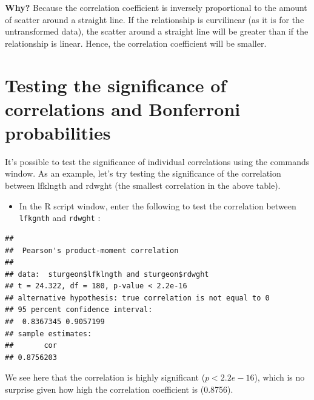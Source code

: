 \documentclass[
  12pt,
]{book}
\newenvironment{Shaded}{\begin{snugshade}}{\end{snugshade}}
\newcommand{\DataTypeTok}[1]{\textcolor[rgb]{0.13,0.29,0.53}{#1}}
\newcommand{\KeywordTok}[1]{\textcolor[rgb]{0.13,0.29,0.53}{\textbf{#1}}}
\newcommand{\NormalTok}[1]{#1}
\newcommand{\OperatorTok}[1]{\textcolor[rgb]{0.81,0.36,0.00}{\textbf{#1}}}
\newcommand{\StringTok}[1]{\textcolor[rgb]{0.31,0.60,0.02}{#1}}
\providecommand{\tightlist}{%
  \setlength{\itemsep}{0pt}\setlength{\parskip}{0pt}}
\begin{document}
\textbf{Why?} Because the correlation coefficient is inversely proportional to the amount of scatter around a straight line. If the relationship is curvilinear (as it is for the untransformed data), the scatter around a straight line will be greater than if the relationship is linear.
Hence, the correlation coefficient will be smaller.

\hypertarget{testing-the-significance-of-correlations-and-bonferroni-probabilities}{%
\section{Testing the significance of correlations and Bonferroni probabilities}\label{testing-the-significance-of-correlations-and-bonferroni-probabilities}}

It's possible to test the significance of individual correlations using the commands window.
As an example, let's try testing the significance of the correlation between lfklngth and rdwght (the smallest correlation in the above table).

\begin{itemize}
\tightlist
\item
  In the R script window, enter the following to test the correlation
  between \texttt{lfkgnth} and \texttt{rdwght} :
\end{itemize}

\begin{Shaded}
\end{Shaded}

\begin{verbatim}
## 
##  Pearson's product-moment correlation
## 
## data:  sturgeon$lfklngth and sturgeon$rdwght
## t = 24.322, df = 180, p-value < 2.2e-16
## alternative hypothesis: true correlation is not equal to 0
## 95 percent confidence interval:
##  0.8367345 0.9057199
## sample estimates:
##       cor 
## 0.8756203
\end{verbatim}

We see here that the correlation is highly significant (\(p< 2.2e-16\)),
which is no surprise given how high the correlation coefficient is (0.8756).
\end{document}
